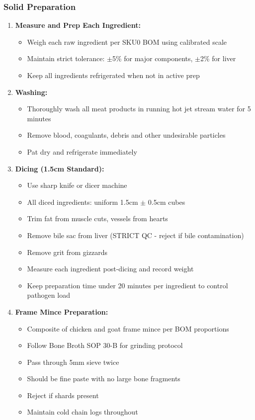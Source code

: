 \subsubsection*{Solid Preparation}
\begin{enumerate}
\item \textbf{Measure and Prep Each Ingredient:}
\begin{itemize}
\item Weigh each raw ingredient per SKU0 BOM using calibrated scale
\item Maintain strict tolerance: $\pm$5\% for major components, $\pm$2\% for liver
\item Keep all ingredients refrigerated when not in active prep
\end{itemize}

\item \textbf{Washing:}
\begin{itemize}
\item Thoroughly wash all meat products in running hot jet stream water for 5 minutes
\item Remove blood, coagulants, debris and other undesirable particles
\item Pat dry and refrigerate immediately
\end{itemize}

\item \textbf{Dicing (1.5cm Standard):}
\begin{itemize}
\item Use sharp knife or dicer machine
\item All diced ingredients: uniform 1.5cm $\pm$ 0.5cm cubes
\item Trim fat from muscle cuts, vessels from hearts
\item Remove bile sac from liver (STRICT QC - reject if bile contamination)
\item Remove grit from gizzards
\item Measure each ingredient post-dicing and record weight
\item Keep preparation time under 20 minutes per ingredient to control pathogen load
\end{itemize}

\item \textbf{Frame Mince Preparation:}
\begin{itemize}
\item Composite of chicken and goat frame mince per BOM proportions
\item Follow Bone Broth SOP 30-B for grinding protocol
\item Pass through 5mm sieve twice
\item Should be fine paste with no large bone fragments
\item Reject if shards present
\item Maintain cold chain logs throughout
\end{itemize}


\end{enumerate}
